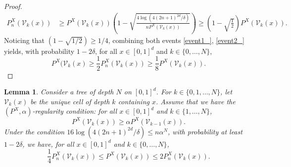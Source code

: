 \documentclass[paper=a4, fontsize=11pt]{scrartcl}
\newtheorem{lemma}[theorem]{Lemma}
\begin{document}
\begin{proof}
\begin{align}
P^X_n(\mathcal{V}_{k}(x))  &\geq P ^X (\mathcal{V}_{k}(x)) \left(1-\sqrt { \frac{4 \log( 4 (2n+1)^{2d} / \delta) }{ nP ^X (\mathcal{V}_{k}(x))  } } \right) \geq \left(1-\sqrt { \frac{1}{ 2} } \right)   P ^X (\mathcal{V}_{k}(x)).
\end{align}
Noticing that $ (1- \sqrt {1 / 2} ) \geq 1/4$, combining both events \eqref{event1_}, \eqref{event2_} yields, with probability $1-2\delta$, for all $x\in [0,1]^d$ and  $k\in \{ 0,\ldots , N\}$,
$$P^X (\mathcal{V}_{k}(x)  \geq \frac 1 2  P^X_n(\mathcal{V}_{k}(x))\geq  \frac{1}{ 8}    P ^X (\mathcal{V}_{k}(x)) . $$
    
\end{proof}



\begin{lemma}\label{lemmaWager1}
Consider a tree of depth $N$ on $[0,1]^d$. For $k \in  \{0,1,\dots,N \}$, let $\mathcal{V}_k(x)$ be the unique cell of depth $k$ containing $x$. Assume that we have the $( P^X,\alpha)$-regularity condition: for all $x\in [0,1]^d$ and  $k \in \{1,\ldots,  N\} $, $$  P^X(\mathcal{V}_{k}(x))  \ge \alpha P^X(\mathcal{V}_{k-1}(x)).$$ 
Under the condition $16\log( 4 (2n+1)^{2d} / \delta) \leq n \alpha^{N}$, with probability at least $1 - 2\delta$,  we have, for all $x\in [0,1]^d$ and $k \in  \{0,\dots,N \}$, 
$$  \frac{1}{ 4}    P_n ^X (\mathcal{V}_{k}(x))  \leq  P^X(\mathcal{V}_{k}(x))\leq 2 P_n^X (\mathcal{V}_{k}(x)). $$
\end{lemma}
\end{document}
